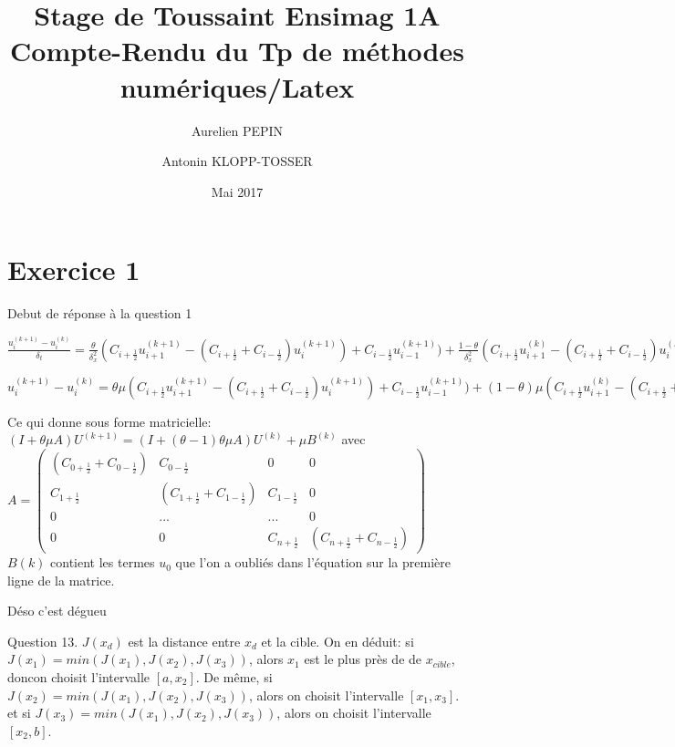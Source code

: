 \documentclass[a4paper,11pt]{article}
\title{Stage de Toussaint Ensimag 1A \\Compte-Rendu du Tp de méthodes numériques/Latex}
\author{Aurelien PEPIN \and Antonin KLOPP-TOSSER}
\date{Mai 2017}
\begin{document}
\maketitle

\section {Exercice 1}

Debut de réponse à la question 1


$\frac{u_i^{(k+1)}-u_i^{(k)}}{\delta_t} = \frac{\theta}{\delta_{x}^{2}}(C_{i+\frac{1}{2}}u_{i+1}^{(k+1)} - (C_{i+\frac{1}{2}} + C_{i-\frac{1}{2}})u_{i}^{(k+1)}) +
C_{i-\frac{1}{2}}u_{i-1}^{(k+1)}) + \frac{1 - \theta}{\delta_{x}^{2}}(C_{i+\frac{1}{2}}u_{i+1}^{(k)} - (C_{i+\frac{1}{2}} + C_{i-\frac{1}{2}})u_{i}^{(k)}) +
C_{i-\frac{1}{2}}u_{i-1}^{(k)}))$

\vspace{1cm}

$u_i^{(k+1)}-u_i^{(k)} = \theta \mu(C_{i+\frac{1}{2}}u_{i+1}^{(k+1)} - (C_{i+\frac{1}{2}} + C_{i-\frac{1}{2}})u_{i}^{(k+1)}) +
C_{i-\frac{1}{2}}u_{i-1}^{(k+1)}) + (1 - \theta)\mu (C_{i+\frac{1}{2}}u_{i+1}^{(k)} - (C_{i+\frac{1}{2}} + C_{i-\frac{1}{2}})u_{i}^{(k)}) +
C_{i-\frac{1}{2}}u_{i-1}^{(k)}))$

\vspace{1cm}
Ce qui donne sous forme matricielle:
\vspace{1cm}
$(I + \theta \mu A) U^{(k+1)} = (I + (\theta - 1) \theta \mu A)U^{(k)} + \mu B^{(k)}$
\vspace{1cm}
avec
$A = \begin{pmatrix}
(C_{0+\frac{1}{2}} + C_{0-\frac{1}{2}}) & C_{0-\frac{1}{2}} & 0 & 0 \\
C_{1+\frac{1}{2}} & (C_{1+\frac{1}{2}} + C_{1-\frac{1}{2}}) & C_{1-\frac{1}{2}} & 0 \\
0 & ... & ... & 0\\
0 & 0 & C_{n+\frac{1}{2}} & (C_{n+\frac{1}{2}} + C_{n-\frac{1}{2}})
\end{pmatrix}$
\vspace{1cm}
$B{(k)}$ contient les termes $u_{0}$ que l'on a oubliés dans l'équation sur la première ligne de la matrice.

\vspace{1cm}
Déso c'est dégueu


Question 13.
\newline
$J(x_d)$ est la distance entre $x_d$ et la cible.
On en déduit:
si $J(x_1) = min(J(x_1), J(x_2), J(x_3))$, alors $x_1$ est le plus près de de $x_{cible}$, doncon choisit l'intervalle $[a, x_2]$.
De même, si $J(x_2) = min(J(x_1), J(x_2), J(x_3))$, alors on choisit l'intervalle $[x_1, x_3]$.
et si $J(x_3) = min(J(x_1), J(x_2), J(x_3))$, alors on choisit l'intervalle $[x_2, b]$.
\end{document}

